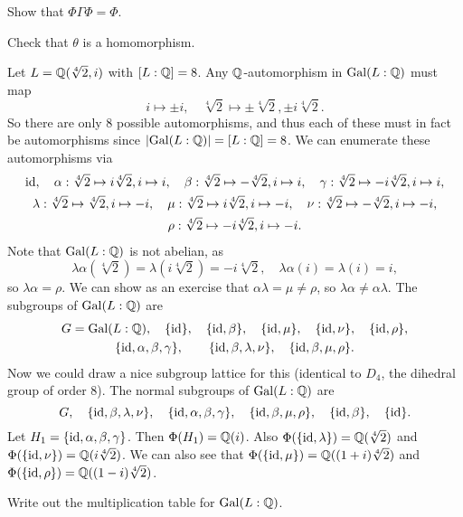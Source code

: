 \begin{exercise}
  Show that $\Phi \Gamma \Phi = \Phi$.
\end{exercise}

\begin{exercise}
  Check that $\theta$ is a homomorphism.
\end{exercise}

\begin{example}
  Let $L = \mathbb{Q}(\sqrt[4]{2}, i)$ with $[L : \mathbb{Q}] = 8$.
  Any $\mathbb{Q}$-automorphism in $\operatorname{Gal}(L : \mathbb{Q})$ must map
  \[
    i \mapsto \pm i, \quad \sqrt[4]{2} \mapsto \pm \sqrt[4]{2}, \pm i\sqrt[4]{2}.
  \]
  So there are only $8$ possible automorphisms, and thus
  each of these must in fact be automorphisms since
  $|{\operatorname{Gal}(L : \mathbb{Q})}| = [L : \mathbb{Q}] = 8$. We can enumerate these
  automorphisms via
  \begin{gather*}
    \mathrm{id}, \quad \alpha : \sqrt[4]{2} \mapsto i\sqrt[4]{2}, i \mapsto i, \quad
    \beta : \sqrt[4]{2} \mapsto -\sqrt[4]{2}, i \mapsto i,
    \quad \gamma : \sqrt[4]{2} \mapsto -i\sqrt[4]{2}, i \mapsto i, \\
    \lambda : \sqrt[4]{2} \mapsto \sqrt[4]{2}, i \mapsto -i, \quad
    \mu : \sqrt[4]{2} \mapsto i\sqrt[4]{2}, i \mapsto -i, \quad
    \nu : \sqrt[4]{2} \mapsto -\sqrt[4]{2}, i \mapsto -i,  \\
    \rho : \sqrt[4]{2} \mapsto -i\sqrt[4]{2}, i \mapsto -i.
  \end{gather*}
  Note that $\operatorname{Gal}(L : \mathbb{Q})$ is not abelian, as
  \[
    \lambda\alpha(\sqrt[4]{2}) = \lambda(i\sqrt[4]{2})
    = -i\sqrt[4]{2}, \quad \lambda \alpha(i) = \lambda(i)
    = i,
  \]
  so $\lambda \alpha = \rho$. We can show as an exercise
  that $\alpha \lambda = \mu \ne \rho$, so
  $\lambda \alpha \ne \alpha \lambda$. The subgroups of
  $\operatorname{Gal}(L : \mathbb{Q})$ are
  \begin{gather*}
    G = \operatorname{Gal}(L : \mathbb{Q}), \quad \{\mathrm{id}\}, \quad
    \{\mathrm{id}, \beta\}, \quad \{\mathrm{id}, \mu\}, \quad
    \{\mathrm{id}, \nu\}, \quad \{\mathrm{id}, \rho\}, \\
    \{\mathrm{id}, \alpha, \beta, \gamma\}, \quad
    \quad \{\mathrm{id}, \beta, \lambda, \nu\},
    \quad \{\mathrm{id}, \beta, \mu, \rho\}.
  \end{gather*}
  Now we could draw a nice subgroup lattice for this
  (identical to $D_4$, the dihedral group of order $8$).
  The normal subgroups of $\operatorname{Gal}(L : \mathbb{Q})$ are
  \[
    G, \quad \{\mathrm{id}, \beta, \lambda, \nu\},
    \quad \{\mathrm{id}, \alpha, \beta, \gamma\}, \quad
    \{\mathrm{id}, \beta, \mu, \rho\}, \quad \{\mathrm{id}, \beta\},
    \quad \{\mathrm{id}\}.
  \]
  Let $H_1 = \{\mathrm{id}, \alpha, \beta, \gamma\}$. Then
  $\Phi(H_1) = \mathbb{Q}(i)$. Also
  $\Phi(\{\mathrm{id}, \lambda\}) = \mathbb{Q}(\sqrt[4]{2})$ and
  $\Phi(\{\mathrm{id}, \nu\}) = \mathbb{Q}(i\sqrt[4]{2})$. We can also
  see that $\Phi(\{\mathrm{id}, \mu\}) = \mathbb{Q}((1 + i)\sqrt[4]{2})$
  and $\Phi(\{\mathrm{id}, \rho\}) = \mathbb{Q}((1 - i)\sqrt[4]{2})$.
\end{example}

\begin{exercise}
  Write out the multiplication table for $\operatorname{Gal}(L : \mathbb{Q})$.
\end{exercise}
